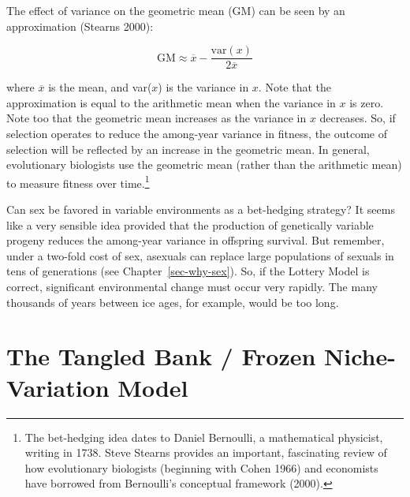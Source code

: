 \documentclass[
  letterpaper,
]{book}
\begin{document}
The effect of variance on the geometric mean (GM) can be seen by an
approximation (Stearns 2000):

\[\text{GM} \approx \overline{x} - \frac{\text{var}(x)}{2\overline{x}}\]

where \(\overline{x}\) is the mean, and var(\(x\)) is the variance in
\(x\). Note that the approximation is equal to the arithmetic mean when
the variance in \(x\) is zero. Note too that the geometric mean
increases as the variance in \(x\) decreases. So, if selection operates
to reduce the among-year variance in fitness, the outcome of selection
will be reflected by an increase in the geometric mean. In general,
evolutionary biologists use the geometric mean (rather than the
arithmetic mean) to measure fitness over time.\footnote{The bet-hedging
  idea dates to Daniel Bernoulli, a mathematical physicist, writing in
  1738. Steve Stearns provides an important, fascinating review of how
  evolutionary biologists (beginning with Cohen 1966) and economists
  have borrowed from Bernoulli's conceptual framework (2000).}

Can sex be favored in variable environments as a bet-hedging strategy?
It seems like a very sensible idea provided that the production of
genetically variable progeny reduces the among-year variance in
offspring survival. But remember, under a two-fold cost of sex, asexuals
can replace large populations of sexuals in tens of generations (see
Chapter~\ref{sec-why-sex}). So, if the Lottery Model is correct,
significant environmental change must occur very rapidly. The many
thousands of years between ice ages, for example, would be too long.

\section{The Tangled Bank / Frozen Niche-Variation
Model}\label{sec-niche}
\end{document}

